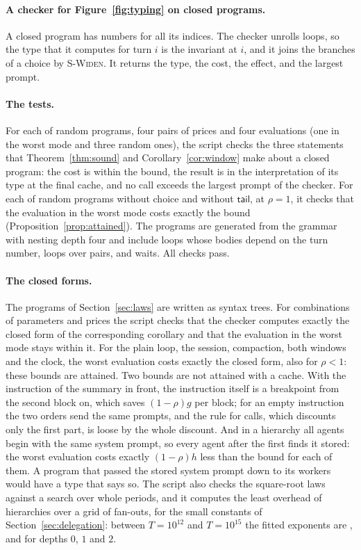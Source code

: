 \documentclass[acmsmall,nonacm,screen]{acmart}
\newcommand{\kw}[1]{\mathsf{#1}}
\begin{document}
\paragraph{A checker for Figure~\ref{fig:typing} on closed programs.} A closed program has
numbers for all its indices. The checker unrolls loops, so the type that it computes for turn
$i$ is the invariant at $i$, and it joins the branches of a choice by \textsc{S-Widen}. It
returns the type, the cost, the effect, and the largest prompt.

\paragraph{The tests.} For each of \exPrograms{} random programs, four pairs of prices and
four evaluations (one in the worst mode and three random ones), the script checks the three
statements that Theorem~\ref{thm:sound} and Corollary~\ref{cor:window} make about a closed
program: the cost is within the bound, the result is in the interpretation of its type at the
final cache, and no call exceeds the largest prompt of the checker. For each of \exExact{}
random programs without choice and without $\kw{tail}$, at $\rho = 1$, it checks that the
evaluation in the worst mode costs exactly the bound (Proposition~\ref{prop:attained}). The
programs are generated from the grammar with nesting depth four and include loops whose
bodies depend on the turn number, loops over pairs, and waits. All checks pass.

\paragraph{The closed forms.} The programs of Section~\ref{sec:laws} are written as syntax
trees. For \exCases{} combinations of parameters and prices the script checks that the checker
computes exactly the closed form of the corresponding corollary and that the evaluation in
the worst mode stays within it. For the plain loop, the session, compaction, both windows and
the clock, the worst evaluation costs exactly the closed form, also for $\rho < 1$: these
bounds are attained. Two bounds are not attained with a cache. With the instruction of the
summary in front, the instruction itself is a breakpoint from the second block on, which
saves $(1-\rho)g$ per block; for an empty instruction the two orders send the same prompts,
and the rule for calls, which discounts only the first part, is loose by the whole discount.
And in a hierarchy all agents begin with the same system prompt,
so every agent after the first finds it stored: the worst evaluation costs exactly
$(1-\rho)h$ less than the bound for each of them. A program that passed the stored system
prompt down to its workers would have a type that says so. The script also checks the square-root laws against a search over whole periods, and it
computes the least overhead of hierarchies over a grid of fan-outs, for the small constants
of Section~\ref{sec:delegation}: between $T = 10^{12}$ and $T = 10^{15}$ the fitted exponents
are \exSlopeZero, \exSlopeOne{} and \exSlopeTwo{} for
depths $0$, $1$ and $2$.
\end{document}
